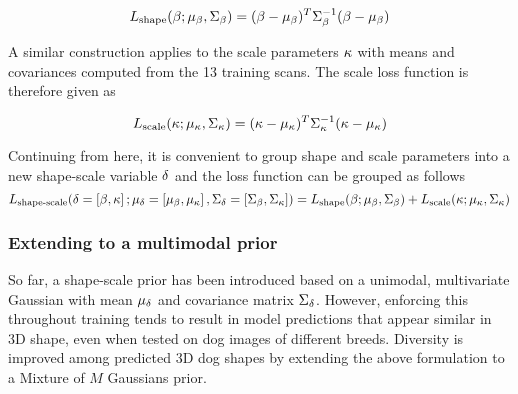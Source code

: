 \begin{equation}
    L_{\textrm{shape}}(\beta;\mu_{\beta},\Sigma_{\beta}) = (\beta - \mu_{\beta})^{T}\Sigma_{\beta}^{-1}(\beta - \mu_{\beta})
\end{equation}

A similar construction applies to the scale parameters $\kappa$ with means and covariances computed from the 13 training scans. The scale loss function is therefore given as

\begin{equation}
    L_{\textrm{scale}}(\kappa;\mu_{\kappa},\Sigma_{\kappa})= (\kappa - \mu_{\kappa})^{T}\Sigma_{\kappa}^{-1}(\kappa - \mu_{\kappa})
\end{equation}

Continuing from here, it is convenient to group shape and scale parameters into a new shape-scale variable $\delta$ and the loss function can be grouped as follows
\begin{equation}
    L_{\textrm{shape-scale}}(\delta=\left[\beta,\kappa\right];\mu_{\delta}=\left[\mu_{\beta},\mu_{\kappa}\right],\Sigma_{\delta}=\left[\Sigma_{\beta},\Sigma_{\kappa}\right]) = L_{\textrm{shape}}(\beta;\mu_{\beta},\Sigma_{\beta}) + L_{\textrm{scale}}(\kappa;\mu_{\kappa},\Sigma_{\kappa})
\end{equation}





\subsubsection{Extending to a multimodal prior}

\def\imgweight{w}

So far, a shape-scale prior has been introduced based on a unimodal, multivariate Gaussian with mean $\mu_{\delta}$ and covariance matrix $\Sigma_{\delta}$. However, enforcing this throughout training tends to result in model predictions that appear similar in 3D shape, even when tested on dog images of different breeds. Diversity is improved among predicted 3D dog shapes by extending the above formulation to a Mixture of $M$ Gaussians prior.

